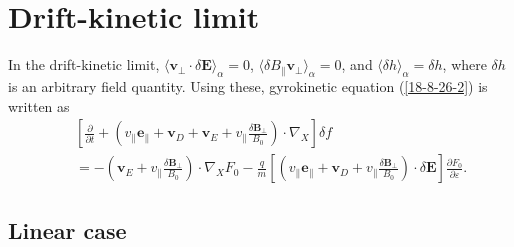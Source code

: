 \documentclass{llncs}
\begin{document}
\

\

\section{Drift-kinetic limit}

In the drift-kinetic limit, $\langle \mathbf{v}_{\perp} \cdot \delta
\mathbf{E} \rangle_{\alpha} = 0$, $\langle \delta B_{\parallel}
\mathbf{v}_{\perp} \rangle_{\alpha} = 0$, and $\langle \delta h
\rangle_{\alpha} = \delta h$, where $\delta h$ is an arbitrary field quantity.
Using these, gyrokinetic equation (\ref{18-8-26-2}) is written as
\begin{eqnarray}
  &  & \left[ \frac{\partial}{\partial t} + \left( v_{\parallel}
  \mathbf{e}_{\parallel} +\mathbf{v}_D +\mathbf{v}_E + v_{\parallel}
  \frac{\delta \mathbf{B}_{\perp}}{B_0} \right) \cdot \nabla_X \right] \delta
  f \nonumber\\
  &  & = - \left( \mathbf{v}_E + v_{\parallel} \frac{\delta
  \mathbf{B}_{\perp}}{B_0} \right) \cdot \nabla_X F_0 - \frac{q}{m} \left[
  \left( v_{\parallel} \mathbf{e}_{\parallel} +\mathbf{v}_D + v_{\parallel}
  \frac{\delta \mathbf{B}_{\perp}}{B_0} \right) \cdot \delta \mathbf{E}
  \right] \frac{\partial F_0}{\partial \varepsilon} .  \label{17-5-14-e1}
\end{eqnarray}

\subsection{Linear case}
\end{document}
